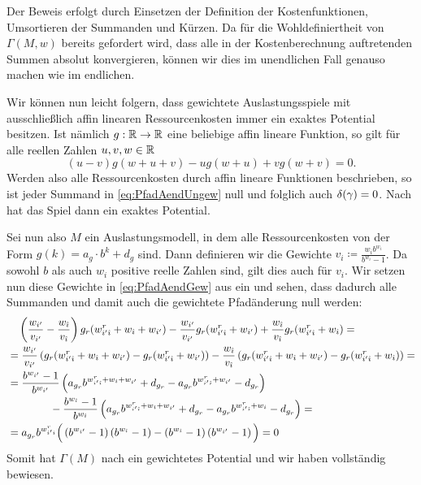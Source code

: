 Der Beweis erfolgt durch Einsetzen der Definition der Kostenfunktionen, Umsortieren der Summanden und Kürzen. Da für die Wohldefiniertheit von $\Gamma(M, w)$ bereits gefordert wird, dass alle in der Kostenberechnung auftretenden Summen absolut konvergieren, können wir dies im unendlichen Fall genauso machen wie im endlichen.

Wir können nun leicht folgern, dass gewichtete Auslastungsspiele mit ausschließlich affin linearen Ressourcenkosten immer ein exaktes Potential besitzen. Ist nämlich $g: \mathbb{R}\to \mathbb{R}$ eine beliebige affin lineare Funktion, so gilt für alle reellen Zahlen $u,v,w \in \mathbb{R}$
	\[(u-v)g(w+u+v) - u g(w+u) + v g(w+v) = 0.\]
Werden also alle Ressourcenkosten durch affin lineare Funktionen beschrieben, so ist jeder Summand in \eqref{eq:PfadAendUngew} null und folglich auch $\delta(\gamma) = 0$. Nach  hat das Spiel dann ein exaktes Potential.

Sei nun also $M$ ein Auslastungsmodell, in dem alle Ressourcenkosten von der Form $g(k) = a_g\cdot b^k + d_g$ sind. Dann definieren wir die Gewichte $v_i \coloneqq \frac{w_i b^{w_i}}{b^{w_i}-1}$. Da sowohl $b$ als auch $w_i$ positive reelle Zahlen sind, gilt dies auch für $v_i$. Wir setzen nun diese Gewichte in \eqref{eq:PfadAendGew} aus  ein und sehen, dass dadurch alle Summanden und damit auch die gewichtete Pfadänderung null werden:
\begin{align*}
	&\quad \left(\frac{w_{i'}}{v_{i'}} - \frac{w_{\hat{\imath}}}{v_{\hat{\imath}}}\right) g_r({w^r_{{i'}{\hat{\imath}}}} + w_{\hat{\imath}} + w_{i'}) - \frac{w_{i'}}{v_{i'}} g_r({w^r_{{i'}{\hat{\imath}}}} + w_{i'})  + \frac{w_{\hat{\imath}}}{v_{\hat{\imath}}} g_r({w^r_{{i'}{\hat{\imath}}}} + w_{\hat{\imath}}) =\\
	&= \frac{w_{i'}}{v_{i'}}\left(g_r({w^r_{{i'}{\hat{\imath}}}} + w_{\hat{\imath}} + w_{i'}) - g_r({w^r_{{i'}{\hat{\imath}}}} + w_{i'})\right) - \frac{w_{\hat{\imath}}}{v_{\hat{\imath}}}\left(g_r({w^r_{{i'}{\hat{\imath}}}} + w_{\hat{\imath}} + w_{i'}) - g_r({w^r_{{i'}{\hat{\imath}}}} + w_{\hat{\imath}})\right) =\\
	&= \frac{b^{w_{i'}}-1}{b^{w_{i'}}}\left(a_{g_r}b^{{w^r_{{i'}{\hat{\imath}}}} + w_{\hat{\imath}} + w_{i'}}+d_{g_r} - a_{g_r} b^{{w^r_{{i'}{\hat{\imath}}}} + w_{i'}} - d_{g_r}\right) \\
	&  \hspace{4em} -\frac{b^{w_{\hat{\imath}}}-1}{b^{w_{\hat{\imath}}}}\left(a_{g_r}b^{{w^r_{{i'}{\hat{\imath}}}} + w_{\hat{\imath}} + w_{i'}}+d_{g_r} - a_{g_r} b^{{w^r_{{i'}{\hat{\imath}}}} + w_{i}} - d_{g_r}\right) =\\
	&= a_{g_r}b^{w^r_{{i'}{\hat{\imath}}}} \Big(\left(b^{w_{i'}}-1\right)\left(b^{w_{\hat{\imath}}}-1\right) - \left(b^{w_{\hat{\imath}}}-1\right)\left(b^{w_{i'}}-1\right)\Big) = 0
\end{align*}
Somit hat $\Gamma(M)$ nach  ein gewichtetes Potential und wir haben  vollständig bewiesen.

